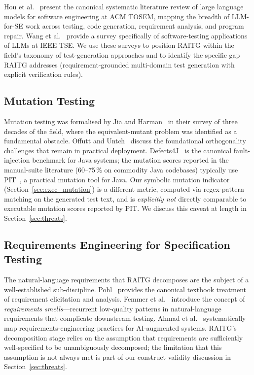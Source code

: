 \documentclass[10pt,twocolumn,letterpaper]{article}
\begin{document}
Hou et al.~\citep{hou2024llm4se} present the canonical systematic
literature review of large language models for software engineering
at ACM TOSEM, mapping the breadth of LLM-for-SE work across testing,
code generation, requirement analysis, and program repair. Wang et
al.~\citep{wang2024llmtesting} provide a survey specifically of
software-testing applications of LLMs at IEEE TSE. We use these
surveys to position RAITG within the field's taxonomy of
test-generation approaches and to identify the specific gap RAITG
addresses (requirement-grounded multi-domain test generation with
explicit verification rules).

\subsection{Mutation Testing}

Mutation testing was formalised by Jia and
Harman~\citep{jia2011mutation} in their survey of three decades of
the field, where the equivalent-mutant problem was identified as a
fundamental obstacle. Offutt and Untch~\citep{offutt2001mutation2000}
discuss the foundational orthogonality challenges that remain in
practical deployment. Defects4J~\citep{just2014defects4j} is the
canonical fault-injection benchmark for Java systems; the mutation
scores reported in the manual-suite literature (60--75\,\% on
commodity Java codebases) typically use PIT~\citep{coles2016pit}, a
practical mutation tool for Java. Our symbolic mutation indicator
(Section~\ref{sec:exec_mutation}) is a different metric, computed via
regex-pattern matching on the generated test text, and is
\emph{explicitly not} directly comparable to executable mutation
scores reported by PIT. We discuss this caveat at length in
Section~\ref{sec:threats}.

\subsection{Requirements Engineering for Specification Testing}

The natural-language requirements that RAITG decomposes are the
subject of a well-established sub-discipline. Pohl~\citep{pohl2010requirements}
provides the canonical textbook treatment of requirement elicitation
and analysis. Femmer et al.~\citep{femmer2017requirements} introduce
the concept of \emph{requirements smells}---recurrent low-quality
patterns in natural-language requirements that complicate downstream
testing. Ahmad et al.~\citep{ahmad2023reai} systematically map
requirements-engineering practices for AI-augmented systems. RAITG's
decomposition stage relies on the assumption that requirements are
sufficiently well-specified to be unambiguously decomposed; the
limitation that this assumption is not always met is part of our
construct-validity discussion in Section~\ref{sec:threats}.
\end{document}
